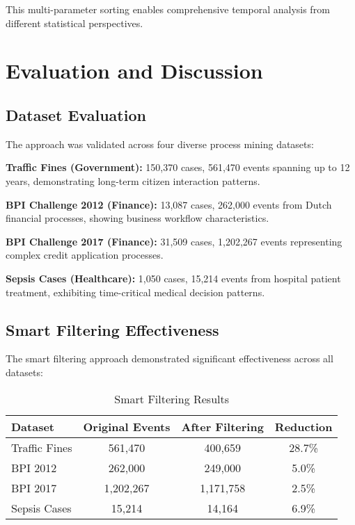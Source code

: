 \documentclass[11pt,a4paper]{article}
\begin{document}
This multi-parameter sorting enables comprehensive temporal analysis from different statistical perspectives.

\section{Evaluation and Discussion}
\label{sec:evaluation}

\subsection{Dataset Evaluation}

The approach was validated across four diverse process mining datasets:

\textbf{Traffic Fines (Government):} 150,370 cases, 561,470 events spanning up to 12 years, demonstrating long-term citizen interaction patterns.

\textbf{BPI Challenge 2012 (Finance):} 13,087 cases, 262,000 events from Dutch financial processes, showing business workflow characteristics.

\textbf{BPI Challenge 2017 (Finance):} 31,509 cases, 1,202,267 events representing complex credit application processes.

\textbf{Sepsis Cases (Healthcare):} 1,050 cases, 15,214 events from hospital patient treatment, exhibiting time-critical medical decision patterns.

\subsection{Smart Filtering Effectiveness}

The smart filtering approach demonstrated significant effectiveness across all datasets:

\begin{table}[H]
\centering
\caption{Smart Filtering Results}
\begin{tabular}{@{}lccc@{}}
\toprule
Dataset & Original Events & After Filtering & Reduction \\
\midrule
Traffic Fines & 561,470 & 400,659 & 28.7\% \\
BPI 2012 & 262,000 & 249,000 & 5.0\% \\
BPI 2017 & 1,202,267 & 1,171,758 & 2.5\% \\
Sepsis Cases & 15,214 & 14,164 & 6.9\% \\
\bottomrule
\end{tabular}
\end{table}
\end{document}

